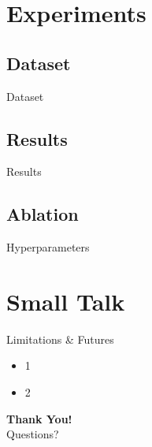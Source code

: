 \documentclass[xcolor=dvipsnames, hyperref={colorlinks,citecolor=violet,linkcolor=violet,urlcolor=violet}]{beamer} %
\begin{document}
\section{Experiments}
    \subsection[short]{Dataset}
        \begin{frame}{Dataset}

        \end{frame}

    \subsection{Results}
        \begin{frame}{Results}{}
            
        \end{frame}

    \subsection{Ablation}
        \begin{frame}{Hyperparameters}{}

        \end{frame}

\section{Small Talk}

    \begin{frame}{Limitations \& Futures}
        \begin{center}
            \begin{itemize}
                \item 1
                \item 2
            \end{itemize}
        \end{center}
    \end{frame}
    
    \begin{frame}[plain]
        \begin{center}
            \textbf{\huge Thank You!}
            \Large \\Questions?
        \end{center}
    \end{frame}

\end{document}
